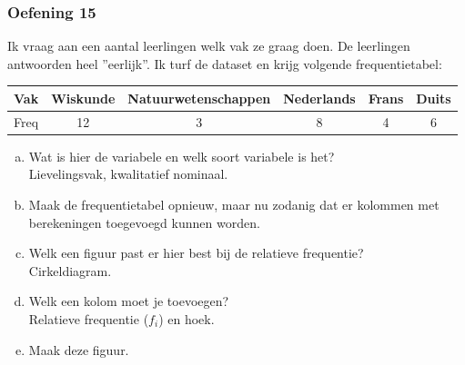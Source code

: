 \documentclass[13pt]{beamer}
\newenvironment{answer}
{\color{blue}}
{\color{black}}
\begin{document}
\begin{frame}
  \frametitle{Oefening 15}
  Ik vraag aan een aantal leerlingen welk vak ze graag doen. De leerlingen antwoorden heel ''eerlijk''. Ik turf de dataset en krijg volgende frequentietabel:
  \begin{small}
    \begin{tabular}{r|ccccc}
      Vak  & Wiskunde & Natuurwetenschappen & Nederlands & Frans & Duits \\
      \hline
      Freq & 12       & 3                   & 8          & 4     & 6     \\
    \end{tabular}
  \end{small}
  \begin{enumerate}[(a)]
  \item Wat is hier de variabele en welk soort variabele is het?\\
    \begin{answer}
      Lievelingsvak, kwalitatief nominaal.
    \end{answer}
  \item Maak de frequentietabel opnieuw, maar nu zodanig dat er kolommen met berekeningen toegevoegd kunnen worden.
  \item Welk een figuur past er hier best bij de relatieve frequentie?\\
    \begin{answer}
      Cirkeldiagram.
    \end{answer}
  \item Welk een kolom moet je toevoegen?\\
    \begin{answer}
      Relatieve frequentie ($f_i$) en hoek.
    \end{answer}
  \item Maak deze figuur.
  \end{enumerate}
\end{frame}
\end{document}
